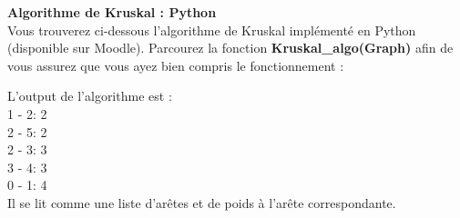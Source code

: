 \begin{Exercice}[15 minutes] \textbf{Algorithme de Kruskal : Python}\\
    Vous trouverez ci-dessous l'algorithme de Kruskal implémenté en Python (disponible sur Moodle). Parcourez la fonction \textbf{Kruskal\_algo(Graph)} afin de vous assurez que vous ayez bien compris le fonctionnement :\\
    
    \begin{conseil}
        L'output de l'algorithme est : \\
        1 - 2: 2\\
        2 - 5: 2\\
        2 - 3: 3\\
        3 - 4: 3\\
        0 - 1: 4\\
        Il se lit comme une liste d'arêtes et de poids à l'arête correspondante.
    \end{conseil}
\end{Exercice}

\newpage


